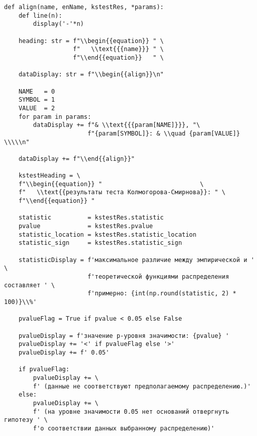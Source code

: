 \documentclass[a4paper, 14pt]{extarticle}
\begin{document}
\begin{lstlisting}
def align(name, enName, kstestRes, *params):
    def line(n):
        display('-'*n)

    heading: str = f"\\begin{{equation}} " \
                   f"   \\text{{{name}}} " \
                   f"\\end{{equation}}   " \
    
    dataDisplay: str = f"\\begin{{align}}\n" 

    NAME   = 0
    SYMBOL = 1
    VALUE  = 2
    for param in params:
        dataDisplay += f"& \\text{{{param[NAME]}}}, "\
                       f"{param[SYMBOL]}: & \\quad {param[VALUE]} \\\\\n"

    dataDisplay += f"\\end{{align}}" 

    kstestHeading = \
    f"\\begin{{equation}} "                           \
    f"   \\text{{результаты теста Колмогорова-Смирнова}}: " \
    f"\\end{{equation}} "                                  

    statistic          = kstestRes.statistic
    pvalue             = kstestRes.pvalue
    statistic_location = kstestRes.statistic_location
    statistic_sign     = kstestRes.statistic_sign

    statisticDisplay = f'максимальное различие между эмпирической и '      \
                       f'теоретической функциями распределения составляет ' \
                       f'примерно: {int(np.round(statistic, 2) * 100)}\\%'

    pvalueFlag = True if pvalue < 0.05 else False

    pvalueDisplay = f'значение p-уровня значимости: {pvalue} '
    pvalueDisplay += '<' if pvalueFlag else '>'
    pvalueDisplay += f' 0.05'

    if pvalueFlag:
        pvalueDisplay += \
        f' (данные не соответствуют предполагаемому распределению.)'
    else:
        pvalueDisplay += \
        f' (на уровне значимости 0.05 нет оснований отвергнуть гипотезу ' \
        f'о соответствии данных выбранному распределению)'


\end{lstlisting}
\end{document}
